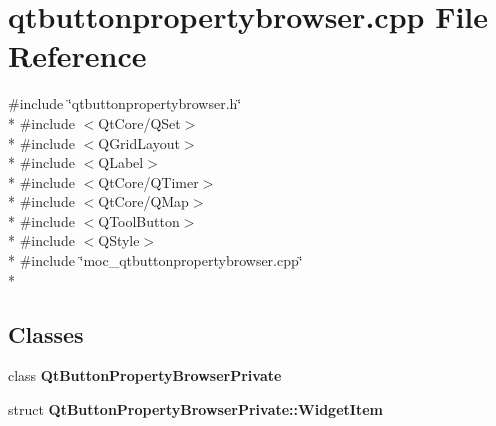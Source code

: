 \section{qtbuttonpropertybrowser.\+cpp File Reference}
\label{qtbuttonpropertybrowser_8cpp}
{\ttfamily \#include \char`\"{}qtbuttonpropertybrowser.\+h\char`\"{}}\\*
{\ttfamily \#include $<$Qt\+Core/\+Q\+Set$>$}\\*
{\ttfamily \#include $<$Q\+Grid\+Layout$>$}\\*
{\ttfamily \#include $<$Q\+Label$>$}\\*
{\ttfamily \#include $<$Qt\+Core/\+Q\+Timer$>$}\\*
{\ttfamily \#include $<$Qt\+Core/\+Q\+Map$>$}\\*
{\ttfamily \#include $<$Q\+Tool\+Button$>$}\\*
{\ttfamily \#include $<$Q\+Style$>$}\\*
{\ttfamily \#include \char`\"{}moc\+\_\+qtbuttonpropertybrowser.\+cpp\char`\"{}}\\*
\subsection*{Classes}
\begin{DoxyCompactItemize}
\item 
class {\bf Qt\+Button\+Property\+Browser\+Private}
\item 
struct {\bf Qt\+Button\+Property\+Browser\+Private\+::\+Widget\+Item}
\end{DoxyCompactItemize}
